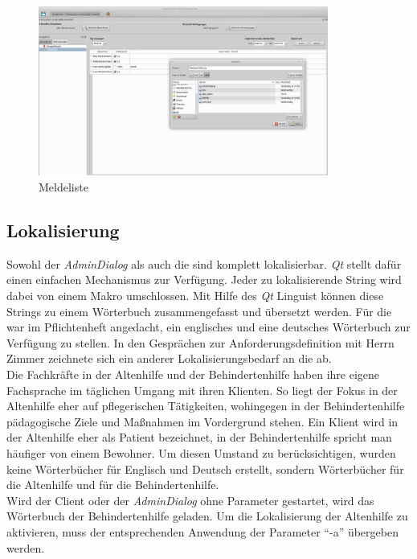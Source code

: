 \begin{itemize}
	\begin{figure}[h]
		\begin{center}
			\includegraphics[keepaspectratio=true, width=0.85\textwidth]{pics/client_meldeliste.png}
			\caption{Meldeliste}
		\end{center}
	\end{figure}
	\FloatBarrier
\end{itemize}
\newpage
\subsection{Lokalisierung}
Sowohl der \textit{AdminDialog} als auch die \EBP sind komplett lokalisierbar. \textit{Qt} stellt dafür einen einfachen Mechanismus zur Verfügung. Jeder zu
lokalisierende String wird dabei von einem Makro umschlossen. Mit Hilfe des \textit{Qt} Linguist können diese Strings zu einem Wörterbuch zusammengefasst und
übersetzt werden. Für die \EBP war im Pflichtenheft angedacht, ein englisches und eine deutsches Wörterbuch zur Verfügung zu stellen. In den
Gesprächen zur Anforderungsdefinition mit Herrn Zimmer zeichnete sich ein anderer Lokalisierungsbedarf an die \EBP ab.\\
Die Fachkräfte in der Altenhilfe und der Behindertenhilfe haben ihre eigene Fachsprache im täglichen Umgang mit ihren Klienten. So liegt der Fokus in
der Altenhilfe eher auf pflegerischen Tätigkeiten, wohingegen in der Behindertenhilfe pädagogische Ziele und Maßnahmen im Vordergrund stehen. Ein
Klient wird in der Altenhilfe eher als Patient bezeichnet, in der Behindertenhilfe spricht man häufiger von einem Bewohner. Um diesen Umstand zu
berücksichtigen, wurden keine Wörterbücher für Englisch und Deutsch erstellt, sondern Wörterbücher für die Altenhilfe und für die Behindertenhilfe.\\
Wird der Client oder der \textit{AdminDialog} ohne Parameter gestartet, wird das Wörterbuch der Behindertenhilfe geladen. Um die Lokalisierung der Altenhilfe
zu aktivieren, muss der entsprechenden Anwendung der Parameter ``-a'' übergeben werden.

